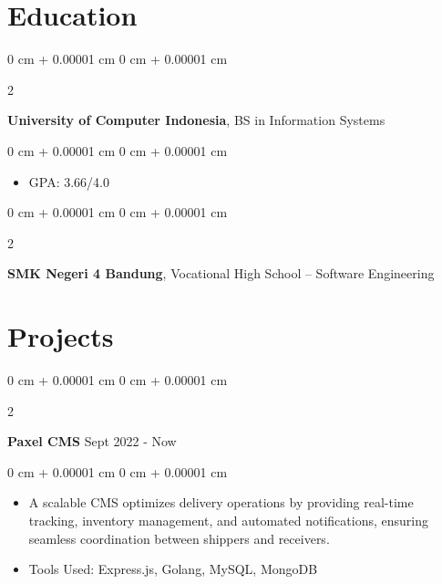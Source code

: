 \documentclass[10pt, letterpaper]{article}
\newenvironment{highlights}{
    \begin{itemize}[
        topsep=0.10 cm,
        parsep=0.10 cm,
        partopsep=0pt,
        itemsep=0pt,
        leftmargin=0 cm + 10pt
    ]
}{
    \end{itemize}
} %
\newenvironment{onecolentry}{
    \begin{adjustwidth}{
        0 cm + 0.00001 cm
    }{
        0 cm + 0.00001 cm
    }
}{
    \end{adjustwidth}
} %
\newenvironment{twocolentry}[2][]{
    \onecolentry
    \def\secondColumn{#2}
    \setcolumnwidth{\fill, 4.5 cm}
    \begin{paracol}{2}
}{
    \switchcolumn \raggedleft \secondColumn
    \end{paracol}
    \endonecolentry
} %
\begin{document}
        \vspace{0.2 cm}

    \section{Education}
        \begin{twocolentry}{
            2023
        }
            \textbf{University of Computer Indonesia}, BS in Information Systems\end{twocolentry}

        \vspace{0.10 cm}
        \begin{onecolentry}
            \begin{highlights}
                \item GPA: 3.66/4.0
            \end{highlights}
        \end{onecolentry}
        
        \vspace{0.2 cm}
        
        \begin{twocolentry}{
            2018
        }
            \textbf{SMK Negeri 4 Bandung}, Vocational High School -- Software Engineering \end{twocolentry}

    
    \section{Projects}
        
        \begin{twocolentry}{
            Sept 2022 - Now
        }
            \textbf{Paxel CMS}\end{twocolentry}

        \vspace{0.10 cm}
        \begin{onecolentry}
            \begin{highlights}
                \item A scalable CMS optimizes delivery operations by providing real-time tracking, inventory management, and automated notifications, ensuring seamless coordination between shippers and receivers.
                \item Tools Used: Express.js, Golang, MySQL, MongoDB
            \end{highlights}
        \end{onecolentry}
\end{document}
